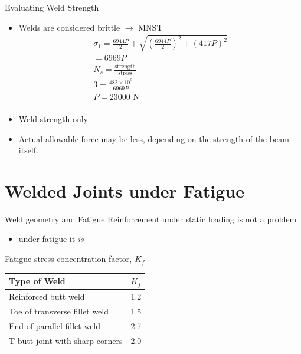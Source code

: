 \documentclass[10pt, svgnames]{beamer}
\begin{document}
\begin{frame}[label={sec:org9dce7be}]{Evaluating Weld Strength}
\begin{itemize}
  \item Welds are considered brittle $\rightarrow$ MNST
        \[\begin{gathered}
            {\sigma _1} = \frac{{6944P}}{2} + \sqrt {{{\left( {\frac{{6944P}}{2}} \right)}^2} + {{(417P)}^2}}  \\
            = 6969P \\
            N_s = \frac{\text{strength}}{\text{stress}} \\
            3 = \frac{482 \times 10^6}{6969P} \\
            P = 23000 \text{ N} \\
          \end{gathered} \]
  \item Weld strength only
  \item Actual allowable force may be less, depending on the strength of the beam itself.
\end{itemize}
\end{frame}

\section{Welded Joints under Fatigue}
\label{sec:orgf3fa238}
\begin{frame}[label={sec:org2b5ed6f}]{Weld geometry and Fatigue}
Reinforcement under static loading is not a problem
\begin{itemize}
  \item under fatigue it \emph{is}
\end{itemize}
\end{frame}

\begin{frame}[label={sec:org441aee8}]{Fatigue stress concentration factor, \(K_f\)}
\centering
\begin{tabular}{lc}
  \toprule
  Type of Weld & $K_f$ \\
  \midrule
  Reinforced butt weld & 1.2 \\
  Toe of transverse fillet weld & 1.5 \\
  End of parallel fillet weld & 2.7 \\
  T-butt joint with sharp corners & 2.0 \\
  \bottomrule
\end{tabular}
\end{frame}
\end{document}
